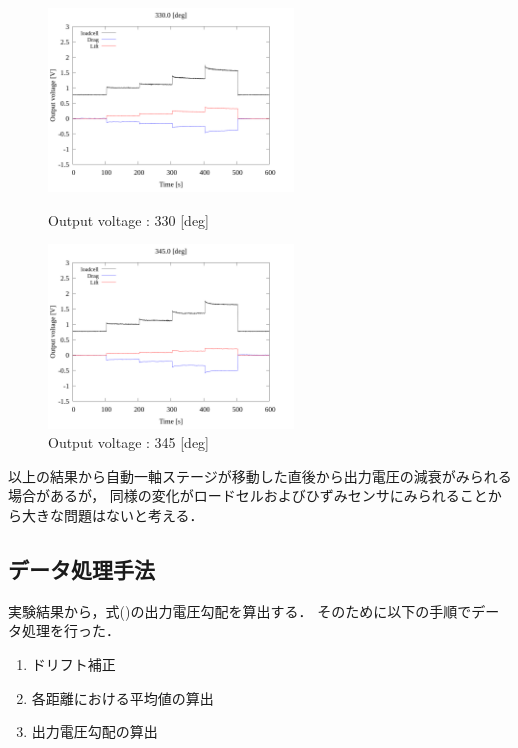 \begin{figure}[htbp]
      \begin{minipage}[b]{0.45\linewidth}
        \centering
        \includegraphics[width=65mm]{../../02_workspace/result/2-1/plot/01-3_allsensors/01_allsensors_3300.png}
        \caption{Output voltage : 330 [deg]}
      \end{minipage}
      \begin{minipage}[b]{0.45\linewidth}
        \centering
        \includegraphics[width=65mm]{../../02_workspace/result/2-1/plot/01-3_allsensors/01_allsensors_3450.png}
        \caption{Output voltage : 345 [deg]}
      \end{minipage}
\end{figure}

\newpage

以上の結果から自動一軸ステージが移動した直後から出力電圧の減衰がみられる場合があるが，
同様の変化がロードセルおよびひずみセンサにみられることから大きな問題はないと考える．

\subsection{データ処理手法}

実験結果から，式()の出力電圧勾配を算出する．
そのために以下の手順でデータ処理を行った．

\begin{enumerate}[(1)]
	\item ドリフト補正
	\item 各距離における平均値の算出
	\item 出力電圧勾配の算出
\end{enumerate}

